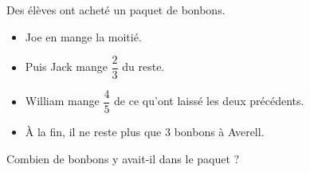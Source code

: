 
Des élèves ont acheté un paquet de bonbons.

\begin{itemize}
    \item Joe en mange la moitié. 
    
    \item Puis Jack mange $\dfrac{2}{3}$ du reste.
    
    \item William mange $\dfrac{4}{5}$ de ce qu'ont laissé les deux précédents.
    
    \item À la fin, il ne reste plus que 3 bonbons à Averell.
\end{itemize}

Combien de bonbons y avait-il dans le paquet ?

